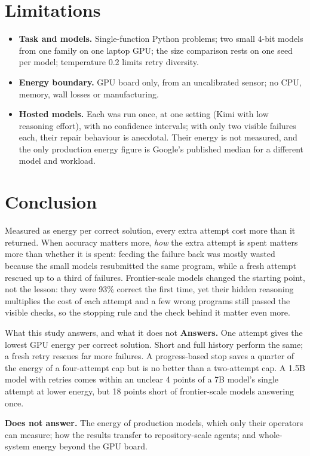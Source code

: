 \documentclass[11pt,a4paper]{article}
\begin{document}
\section{Limitations}
\begin{itemize}
\item \textbf{Task and models.} Single-function Python problems; two small 4-bit models from one family on one laptop GPU; the size comparison rests on one seed per model; temperature 0.2 limits retry diversity.
\item \textbf{Energy boundary.} GPU board only, from an uncalibrated sensor; no CPU, memory, wall losses or manufacturing.
\item \textbf{Hosted models.} Each was run once, at one setting (Kimi with low reasoning effort), with no confidence intervals; with only two visible failures each, their repair behaviour is anecdotal. Their energy is not measured, and the only production energy figure is Google's published median for a different model and workload.
\end{itemize}

\section{Conclusion}
Measured as energy per correct solution, every extra attempt cost more than it returned. When accuracy matters more, \emph{how} the extra attempt is spent matters more than whether it is spent: feeding the failure back was mostly wasted because the small models resubmitted the same program, while a fresh attempt rescued up to a third of failures. Frontier-scale models changed the starting point, not the lesson: they were 93\% correct the first time, yet their hidden reasoning multiplies the cost of each attempt and a few wrong programs still passed the visible checks, so the stopping rule and the check behind it matter even more.

\begin{keybox}{What this study answers, and what it does not}
\textbf{Answers.} One attempt gives the lowest GPU energy per correct solution. Short and full history perform the same; a fresh retry rescues far more failures. A progress-based stop saves a quarter of the energy of a four-attempt cap but is no better than a two-attempt cap. A 1.5B model with retries comes within an unclear 4 points of a 7B model's single attempt at lower energy, but 18 points short of frontier-scale models answering once.

\textbf{Does not answer.} The energy of production models, which only their operators can measure; how the results transfer to repository-scale agents; and whole-system energy beyond the GPU board.
\end{keybox}
\end{document}
